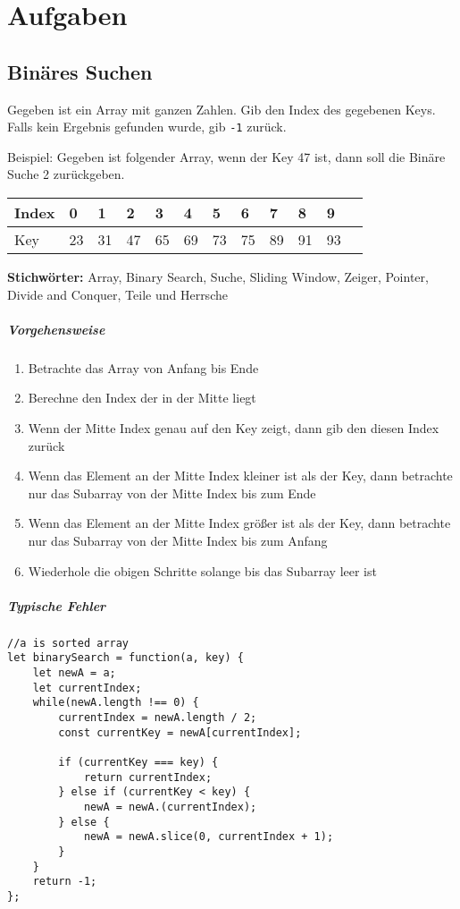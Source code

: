 \documentclass[babel]{book}
\begin{document}
\chapter{Aufgaben}
\section{Binäres Suchen}
\begin{examplei}
Gegeben ist ein Array mit ganzen Zahlen. Gib den Index des gegebenen Keys. Falls kein Ergebnis gefunden wurde, gib \lstinline|-1| zurück.

Beispiel:
Gegeben ist folgender Array, wenn der Key 47 ist, dann soll die Binäre Suche 2 zurückgeben.


	\begin{tabular}{|l|l|l|l|l|l|l|l|l|l|l|l|} 
		\hline
		Index     & 0 & 1 & 2 & 3 & 4 & 5  & 6  & 7  & 8  & 9 \\ 
		\hline
		Key & 23 & 31 & 47	  & 65 & 69 & 73 & 75 & 89 & 91 & 93 \\
		\hline
	\end{tabular}

\end{examplei}
{\bf Stichwörter:} Array, Binary Search, Suche, Sliding Window, Zeiger, Pointer, Divide and Conquer, Teile und Herrsche
\paragraph{Vorgehensweise}
\begin{enumerate} 
	\item Betrachte das Array von Anfang bis Ende
	\item Berechne den Index der in der Mitte liegt
	\item Wenn der Mitte Index genau auf den Key zeigt, dann gib den diesen Index zurück
	\item Wenn das Element an der Mitte Index kleiner ist als der Key, dann betrachte nur das Subarray von der Mitte Index bis zum Ende
	\item Wenn das Element an der Mitte Index größer ist als der Key, dann betrachte nur das Subarray von der Mitte Index bis zum Anfang
	\item Wiederhole die obigen Schritte solange bis das Subarray leer ist
\end{enumerate}

\paragraph{Typische Fehler}
\begin{lstlisting}[caption=My Javascript Example]
//a is sorted array
let binarySearch = function(a, key) {
	let newA = a;
	let currentIndex;
	while(newA.length !== 0) {
		currentIndex = newA.length / 2;
		const currentKey = newA[currentIndex];
	
		if (currentKey === key) {
			return currentIndex;
		} else if (currentKey < key) {
			newA = newA.(currentIndex);
		} else {
			newA = newA.slice(0, currentIndex + 1);
		}
	}
	return -1;
};
\end{lstlisting}
\end{document}
